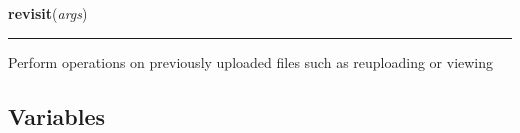     \vspace{0.5ex}

\hspace{.8\funcindent}\begin{boxedminipage}{\funcwidth}

    \raggedright \textbf{revisit}(\textit{args})

    \vspace{-1.5ex}

    \rule{\textwidth}{0.5\fboxrule}
\setlength{\parskip}{2ex}
    Perform operations on previously uploaded files such as reuploading or 
    viewing

\setlength{\parskip}{1ex}
    \end{boxedminipage}



  \subsection{Variables}

